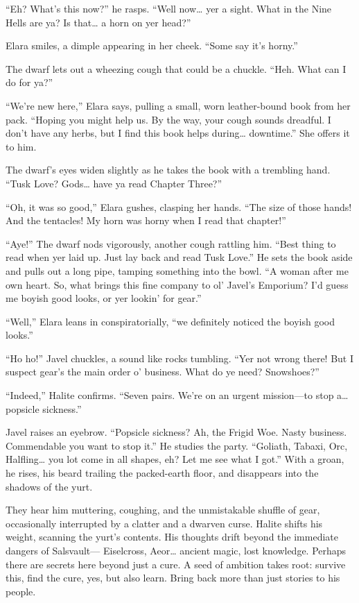 \documentclass[
  letterpaper,12pt,twoside,twocolumn,openany,
  nodeprecatedcode,bg=full]{dndbook}
\begin{document}
``Eh? What's this now?'' he rasps. ``Well now\ldots{} yer a sight. What
in the Nine Hells are ya? Is that\ldots{} a horn on yer head?''

Elara smiles, a dimple appearing in her cheek. ``Some say it's horny.''

The dwarf lets out a wheezing cough that could be a chuckle. ``Heh. What
can I do for ya?''

``We're new here,'' Elara says, pulling a small, worn leather-bound book
from her pack. ``Hoping you might help us. By the way, your cough sounds
dreadful. I don't have any herbs, but I find this book helps
during\ldots{} downtime.'' She offers it to him.

The dwarf's eyes widen slightly as he takes the book with a trembling
hand. ``Tusk Love? Gods\ldots{} have ya read Chapter Three?''

``Oh, it was so good,'' Elara gushes, clasping her hands. ``The size of
those hands! And the tentacles! My horn was horny when I read that
chapter!''

``Aye!'' The dwarf nods vigorously, another cough rattling him. ``Best
thing to read when yer laid up. Just lay back and read Tusk Love.'' He
sets the book aside and pulls out a long pipe, tamping something into
the bowl. ``A woman after me own heart. So, what brings this fine
company to ol' Javel's Emporium? I'd guess me boyish good looks, or yer
lookin' for gear.''

``Well,'' Elara leans in conspiratorially, ``we definitely noticed the
boyish good looks.''

``Ho ho!'' Javel chuckles, a sound like rocks tumbling. ``Yer not wrong
there! But I suspect gear's the main order o' business. What do ye need?
Snowshoes?''

``Indeed,'' Halite confirms. ``Seven pairs. We're on an urgent
mission---to stop a\ldots{} popsicle sickness.''

Javel raises an eyebrow. ``Popsicle sickness? Ah, the Frigid Woe. Nasty
business. Commendable you want to stop it.'' He studies the party.
``Goliath, Tabaxi, Orc, Halfling\ldots{} you lot come in all shapes, eh?
Let me see what I got.'' With a groan, he rises, his beard trailing the
packed-earth floor, and disappears into the shadows of the yurt.

They hear him muttering, coughing, and the unmistakable shuffle of gear,
occasionally interrupted by a clatter and a dwarven curse. Halite shifts
his weight, scanning the yurt's contents. His thoughts drift beyond the
immediate dangers of Salsvault--- Eiselcross, Aeor\ldots{} ancient
magic, lost knowledge. Perhaps there are secrets here beyond just a
cure. A seed of ambition takes root: survive this, find the cure, yes,
but also learn. Bring back more than just stories to his people.
\end{document}
